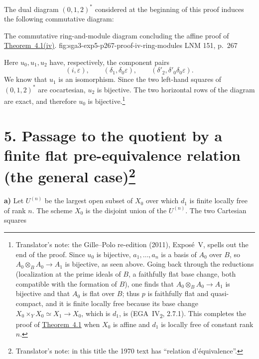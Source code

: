 
The dual diagram \hyperref[fig:sga3-exp5-dual-012star]{\((0,1,2)^\ast\)} considered at the beginning of this
proof induces the following commutative diagram:

  {The commutative ring-and-module diagram concluding the affine proof
  of \hyperref[thm:sga3-V-4.1-iv]{Theorem~4.1(iv)}.}
  {fig:sga3-exp5-p267-proof-iv-ring-modules}
  {LNM 151, p.~267}

Here \(u_0,u_1,u_2\) have, respectively, the component pairs
\[
  (i,\varepsilon),\qquad
  (\delta_1,\delta_0\varepsilon),\qquad
  (\delta'_2,\delta'_0\delta_0\varepsilon).
\]
We know that \(u_1\) is an isomorphism. Since the two left-hand
squares of \((0,1,2)^\ast\) are cocartesian, \(u_2\) is bijective.
The two horizontal rows of the diagram are exact, and therefore
\(u_0\) is bijective.\footnote{Translator's note: the Gille--Polo re-edition (2011), Exposé~V, spells out
the end of the proof. Since \(u_0\) is bijective, \(a_1,\ldots,a_n\) is a basis of
\(A_0\) over \(B\), so \(A_0\otimes_BA_0\to A_1\) is bijective, as seen above.
Going back through the reductions (localization at the prime ideals of
\(B\), a faithfully flat base change, both compatible with the formation of
\(B\)), one finds that \(A_0\otimes_BA_0\to A_1\) is bijective and that \(A_0\)
is flat over \(B\); thus \(p\) is faithfully flat and quasi-compact, and it is
finite locally free because its base change
\(X_0\times_YX_0\simeq X_1\to X_0\), which is \(d_1\), is
(EGA~IV\textsubscript{2}, 2.7.1). This completes the proof of \hyperref[thm:sga3-V-4.1]{Theorem~4.1} when \(X_0\) is
affine and \(d_1\) is locally free of constant rank \(n\).}

\section*{5. Passage to the quotient by a finite flat pre-equivalence
  relation (the general case)\footnote{Translator's note: in this title the 1970 text has ``relation
  d'équivalence''.}}
\label{sec:sga3-V-5}

\label{par:sga3-V-5-a}%
\noindent\textbf{a)}
Let \(U^{(n)}\) be the largest open subset of \(X_0\) over which
\(d_1\) is finite locally free of rank \(n\). The scheme \(X_0\) is
the disjoint union of the \(U^{(n)}\). The two Cartesian squares

